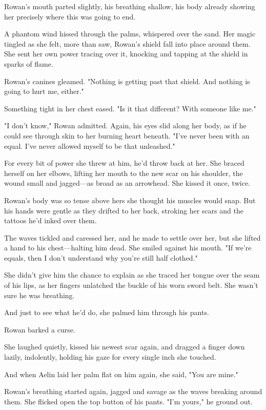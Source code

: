 Rowan's mouth parted slightly, his breathing shallow, his body already showing her precisely where this was going to end.

A phantom wind hissed through the palms, whispered over the sand. Her magic tingled as she felt, more than saw, Rowan's shield fall into place around them. She sent her own power tracing over it, knocking and tapping at the shield in sparks of flame.

Rowan's canines gleamed. "Nothing is getting past that shield. And nothing is going to hurt me, either."

Something tight in her chest eased. "Is it that different? With someone like me."

"I don't know," Rowan admitted. Again, his eyes slid along her body, as if he could see through skin to her burning heart beneath. "I've never been with  an equal. I've never allowed myself to be that unleashed."

For every bit of power she threw at him, he'd throw back at her. She braced herself on her elbows, lifting her mouth to the new scar on his shoulder, the wound small and jagged---as broad as an arrowhead. She kissed it once, twice.

Rowan's body was so tense above hers she thought his muscles would snap. But his hands were gentle as they drifted to her back, stroking her scars and the tattoos he'd inked over them.

The waves tickled and caressed her, and he made to settle over her, but she lifted a hand to his chest---halting him dead. She smiled against his mouth. "If we're equals, then I don't understand why you're still half clothed."

She didn't give him the chance to explain as she traced her tongue over the seam of his lips, as her fingers unlatched the buckle of his worn sword belt. She wasn't sure he was breathing.

And just to see what he'd do, she palmed him through his pants.

Rowan barked a curse.

She laughed quietly, kissed his newest scar again, and dragged a finger down lazily, indolently, holding his gaze for every single inch she touched.

And when Aelin laid her palm flat on him again, she said, "You are mine."

Rowan's breathing started again, jagged and savage as the waves breaking around them. She flicked open the top button of his pants. "I'm yours," he ground out.

